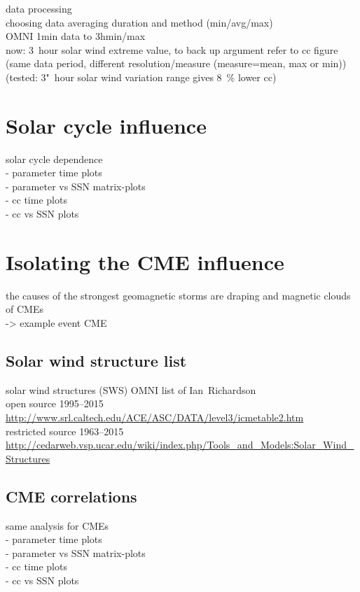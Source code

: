 data processing\\
choosing data averaging duration and method (min/avg/max)\\
OMNI 1min data to 3hmin/max\\
now: 3~hour solar wind extreme value, to back up argument refer to cc figure (same data period, different resolution/measure (measure=mean, max or min))\\
		(tested: 3"~hour solar wind variation range gives 8~\% lower cc)\\


\section{Solar cycle influence}
solar cycle dependence\\
- parameter time plots\\
- parameter vs SSN matrix-plots\\
- cc time plots\\
- cc vs SSN plots\\


\section{Isolating the CME influence}
the causes of the strongest geomagnetic storms are draping and magnetic clouds of CMEs \citep{Bothmer1993}\\
-> example event CME\\

\subsection{Solar wind structure list}
solar wind structures (SWS) OMNI list of Ian~Richardson \citep{Richardson2012}\\
open source 1995--2015 \url{http://www.srl.caltech.edu/ACE/ASC/DATA/level3/icmetable2.htm}\\
restricted source 1963--2015 \url{http://cedarweb.vsp.ucar.edu/wiki/index.php/Tools_and_Models:Solar_Wind_Structures} \citet{Richardson2012}\\	%

\subsection{CME correlations}
same analysis for CMEs\\
- parameter time plots\\
- parameter vs SSN matrix-plots\\
- cc time plots\\
- cc vs SSN plots\\


